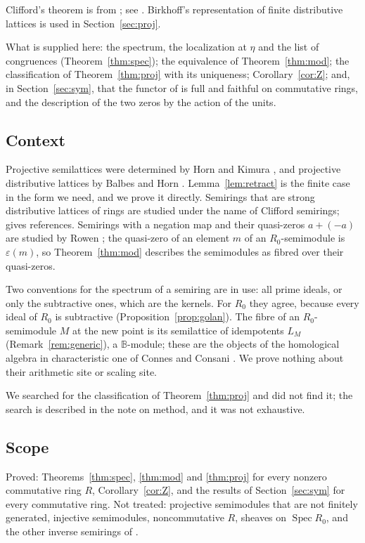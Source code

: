 \documentclass[11pt]{amsart}
\theoremstyle{remark}
\newcommand{\B}{\mathbb B}
\DeclareMathOperator{\Spec}{Spec}
\begin{document}
Clifford's theorem is from \cite{Clifford}; see \cite[Ch.~4]{Howie}. Birkhoff's representation of finite distributive lattices \cite{Birkhoff} is used in Section~\ref{sec:proj}.

What is supplied here: the spectrum, the localization at $\eta$ and the list of congruences (Theorem~\ref{thm:spec}); the equivalence of Theorem~\ref{thm:mod}; the classification of Theorem~\ref{thm:proj} with its uniqueness; Corollary~\ref{cor:Z}; and, in Section~\ref{sec:sym}, that the functor of \cite{FGJM} is full and faithful on commutative rings, and the description of the two zeros by the action of the units.

\subsection{Context}
Projective semilattices were determined by Horn and Kimura \cite{HK}, and projective distributive lattices by Balbes and Horn \cite{BH}. Lemma~\ref{lem:retract} is the finite case in the form we need, and we prove it directly. Semirings that are strong distributive lattices of rings are studied under the name of Clifford semirings; \cite[\S1]{FGJM} gives references. Semirings with a negation map and their quasi-zeros $a+(-a)$ are studied by Rowen \cite{Rowen}; the quasi-zero of an element $m$ of an $R_0$-semimodule is $\varepsilon(m)$, so Theorem~\ref{thm:mod} describes the semimodules as fibred over their quasi-zeros.

Two conventions for the spectrum of a semiring are in use: all prime ideals, or only the subtractive ones, which are the kernels. For $R_0$ they agree, because every ideal of $R_0$ is subtractive (Proposition~\ref{prop:golan}). The fibre of an $R_0$-semimodule $M$ at the new point is its semilattice of idempotents $L_M$ (Remark~\ref{rem:generic}), a $\B$-module; these are the objects of the homological algebra in characteristic one of Connes and Consani \cite{CC}. We prove nothing about their arithmetic site or scaling site.

We searched for the classification of Theorem~\ref{thm:proj} and did not find it; the search is described in the note on method, and it was not exhaustive.

\subsection{Scope}
Proved: Theorems~\ref{thm:spec}, \ref{thm:mod} and \ref{thm:proj} for every nonzero commutative ring $R$, Corollary~\ref{cor:Z}, and the results of Section~\ref{sec:sym} for every commutative ring. Not treated: projective semimodules that are not finitely generated, injective semimodules, noncommutative $R$, sheaves on $\Spec R_0$, and the other inverse semirings of \cite{FGJM}.
\end{document}
